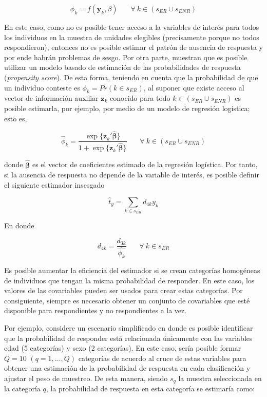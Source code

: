 \documentclass[
  12pt,
]{book}
\begin{document}
\[
\phi_k = f(\mathbf{y}_k, \beta)   \ \ \ \ \ \ \ \ \forall \ k \in (s_{ER} \cup s_{ENR})
\]

En este caso, como no es posible tener acceso a la variables de interés para todos los individuos en la muestra de unidades elegibles (precisamente porque no todos respondieron), entonces no es posible estimar el patrón de ausencia de respuesta y por ende habrán problemas de sesgo. Por otra parte, \citet{Kim_Riddles_2012} muestran que es posible utilizar un modelo basado de estimación de las probabilidades de respuesta (\emph{propensity score}). De esta forma, teniendo en cuenta que la probabilidad de que un individuo conteste es \(\phi_k = Pr(k \in s_{ER})\), al suponer que existe acceso al vector de información auxiliar \(\mathbf{z}_k\) conocido para todo \(k\in (s_{ER} \cup s_{ENR})\) es posible estimarla, por ejemplo, por medio de un modelo de regresión logística; esto es,

\[
\hat{\phi}_k = \frac{\exp\{\mathbf{z}_k'\hat{\boldsymbol{\beta}}\}}{1 + \exp\{\mathbf{z}_k'\hat{\boldsymbol{\beta}}\}}   \ \ \ \ \ \ \ \ \forall \ k \in (s_{ER} \cup s_{ENR})
\]

donde \(\hat{\mathbf{\beta}}\) es el vector de coeficientes estimado de la regresión logística. Por tanto, si la ausencia de respuesta no depende de la variable de interés, es posible definir el siguiente estimador insesgado

\[
\hat{t}_y=\sum_{k\in s_{ER}}d_{4k}y_k
\]

En donde

\[
d_{4k} = \frac{d_{3k}}{\hat{\phi_k}}  \ \ \ \ \ \ \ \ \forall \ k  \in s_{ER}
\]

Es posible aumentar la eficiencia del estimador si se crean categorías homogéneas de individuos que tengan la misma probabilidad de responder. En este caso, los valores de las covariables pueden ser usados para crear estas categorías. Por consiguiente, siempre es necesario obtener un conjunto de covariables que esté disponible para respondientes y no respondientes a la vez.

Por ejemplo, considere un escenario simplificado en donde es posible identificar que la probabilidad de responder está relacionada únicamente con las variables edad (5 categorías) y sexo (2 categorías). En este caso, sería posible formar \(Q=10\) \((q = 1, \ldots, Q)\) categorías de acuerdo al cruce de estas variables para obtener una estimación de la probabilidad de respuesta en cada clasificación y ajustar el peso de muestreo. De esta manera, siendo \(s_{q}\) la muestra seleccionada en la categoría \(q\), la probabilidad de respuesta en esta categoría se estimaría como:
\end{document}
